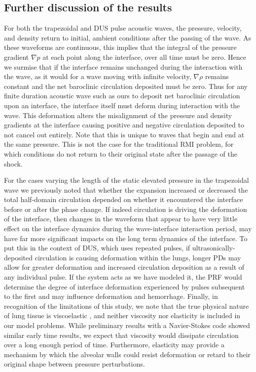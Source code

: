 \subsection{Further discussion of the results}%
\label{subsec:usbe_lung_further_discussion}%
For both the trapezoidal and \ac{DUS} pulse acoustic waves, the
pressure, velocity, and density return to initial, ambient conditions
after the passing of the wave. As these waveforms are continuous, this
implies that the integral of the pressure gradient $\nabla p$ at each
point along the interface, over all time must be zero. Hence we
surmise that if the interface remains unchanged during the interaction
with the wave, as it would for a wave moving with infinite velocity,
$\nabla \rho$ remains constant and the net baroclinic circulation
deposited must be zero. Thus for any finite duration acoustic wave
such as ours to deposit net baroclinic circulation upon an interface,
the interface itself must deform during interaction with the
wave. This deformation alters the misalignment of the pressure and
density gradients at the interface causing positive and negative
circulation deposited to not cancel out entirely. Note that this is
unique to waves that begin and end at the same pressure. This is not
the case for the traditional \ac{RMI} problem, for which conditions do
not return to their original state after the passage of the shock.

For the cases varying the length of the static elevated pressure in
the trapezoidal wave we previously noted that whether the expansion
increased or decreased the total half-domain circulation depended on
whether it encountered the interface before or after the phase
change. If indeed circulation is driving the deformation of the
interface, then changes in the waveform that appear to have very
little effect on the interface dynamics during the wave-interface
interaction period, may have far more significant impacts on the long
term dynamics of the interface. To put this in the context of
\ac{DUS}, which uses repeated pulses, if ultrasonically-deposited
circulation is causing deformation within the lungs, longer \acp{PD}
may allow for greater deformation and increased circulation deposition
as a result of any individual pulse. If the system acts as we have
modeled it, the \ac{PRF} would determine the degree of interface
deformation experienced by pulses subsequent to the first and may
influence deformation and hemorrhage. Finally, in recognition of the
limitations of this study, we note that the true physical nature of
lung tissue is viscoelastic \citep{Bayliss1939}, and neither viscosity
nor elasticity is included in our model problems. While preliminary
results with a Navier-Stokes code showed similar early time results,
we expect that viscosity would dissipate circulation over a long
enough period of time. Furthermore, elasticity may provide a mechanism
by which the alveolar walls could resist deformation or retard to
their original shape between pressure perturbations.




